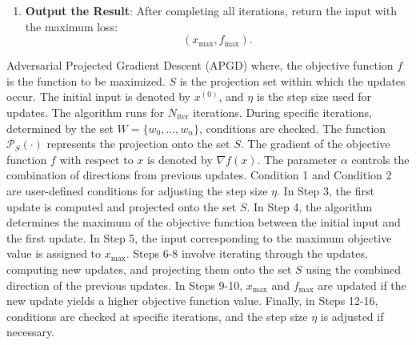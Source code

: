 \begin{enumerate}
    \item \textbf{Output the Result}:  
    After completing all iterations, return the input with the maximum loss:  
    \[
    (x_{\text{max}}, f_{\text{max}}).
    \]
\end{enumerate}

Adversarial Projected Gradient Descent (APGD) where, the objective function $f$ is the function to be maximized. $S$ is the projection set within which the updates occur. The initial input is denoted by $x^{(0)}$, and $\eta$ is the step size used for updates. The algorithm runs for $N_{\text{iter}}$ iterations. During specific iterations, determined by the set $W = \{w_0, \ldots, w_n\}$, conditions are checked. The function $\mathcal{P}_S(\cdot)$ represents the projection onto the set $S$. The gradient of the objective function $f$ with respect to $x$ is denoted by $\nabla f(x)$. The parameter $\alpha$ controls the combination of directions from previous updates. Condition 1 and Condition 2 are user-defined conditions for adjusting the step size $\eta$.
In Step 3, the first update is computed and projected onto the set $S$. In Step 4, the algorithm determines the maximum of the objective function between the initial input and the first update. In Step 5, the input corresponding to the maximum objective value is assigned to $x_{\text{max}}$. Steps 6-8 involve iterating through the updates, computing new updates, and projecting them onto the set $S$ using the combined direction of the previous updates. In Steps 9-10, $x_{\text{max}}$ and $f_{\text{max}}$ are updated if the new update yields a higher objective function value. Finally, in Steps 12-16, conditions are checked at specific iterations, and the step size $\eta$ is adjusted if necessary.


